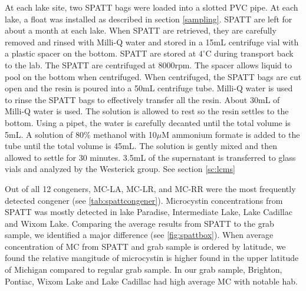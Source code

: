 At each lake site, two SPATT bags were loaded into a slotted PVC pipe. At each lake, a float was installed as described in section \ref{sampling}. SPATT are left for about a month at each lake. When SPATT are retrieved, they are carefully removed and rinsed with Milli-Q water and stored in a 15mL centrifuge vial with a plastic spacer on the bottom. SPATT are stored at $4^\circ$C during transport back to the lab. The SPATT are centrifuged at 8000rpm. The spacer allows liquid to pool on the bottom when centrifuged. When centrifuged, the SPATT bags are cut open and the resin is poured into a 50mL centrifuge tube. Milli-Q water is used to rinse the SPATT bags to effectively transfer all the resin. About 30mL of Milli-Q water is used. The solution is allowed to rest so the resin settles to the bottom. Using a pipet, the water is carefully decanted until the total volume is 5mL.  A solution of 80\% methanol with 10$\mu$M ammonium formate is added to the tube until the total volume is 45mL. The solution is gently mixed and then allowed to settle for 30 minutes. 3.5mL of the supernatant is transferred to glass vials and analyzed by the Westerick group. See section \ref{sc:lcms}


Out of all 12 congeners, MC-LA, MC-LR, and MC-RR were the most frequently detected congener (see \ref{tab:spattcongener}). Microcystin concentrations from SPATT was mostly detected in lake Paradise, Intermediate Lake, Lake Cadillac and Wixom Lake. Comparing the average results from SPATT to the grab sample, we identified a major difference (see \ref{fig:spattbox}). When average concentration of MC from SPATT and grab sample is ordered by latitude, we found the relative mangitude of microcystin is higher found in the upper latitude of Michigan compared to regular grab sample. In our grab sample, Brighton, Pontiac, Wixom Lake and Lake Cadillac had high average MC with notable \gls{hab}.








